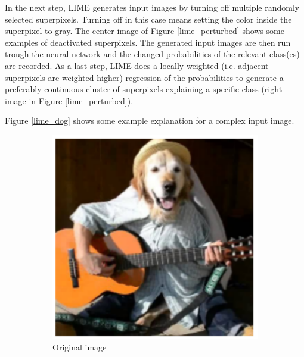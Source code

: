 In the next step, LIME generates input images by turning off multiple randomly selected superpixels. Turning off in this case means setting the color inside the superpixel to gray. The center image of Figure \ref{lime_perturbed} shows some examples of deactivated superpixels. The generated input images are then run trough the neural network and the changed probabilities of the relevant class(es) are recorded. As a last step, LIME does a locally weighted (i.e. adjacent superpixels are weighted higher) regression of the probabilities to generate a preferably continuous cluster of superpixels explaining a specific class (right image in Figure \ref{lime_perturbed}).

Figure \ref{lime_dog} shows some example explanation for a complex input image.

\begin{figure}[H]
    \centering
    \begin{subfigure}[t]{.23\textwidth}
        \centering
        \includegraphics[width=\linewidth]{chapters/02_methods/images/lime_dog_1.png}
        \caption{Original image}
    \end{subfigure}\hfill%
    \begin{subfigure}[t]{.23\textwidth}
        \centering

\end{subfigure}
\end{figure}
